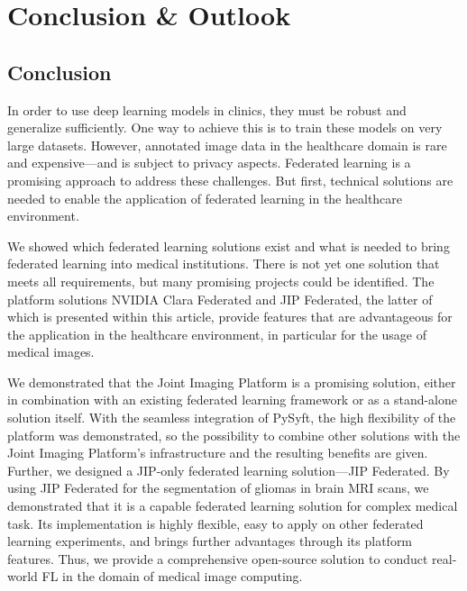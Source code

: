 \section{Conclusion \& Outlook}
\label{sec:ConclusionOutlook}

\subsection{Conclusion}
\label{subsec:Conclusion}
In order to use deep learning models in clinics, they must be robust and generalize sufficiently. One way to achieve this is to train these models on very large datasets. However, annotated image data in the healthcare domain is rare and expensive---and is subject to privacy aspects.
Federated learning is a promising approach to address these challenges. But first, technical solutions are needed to enable the application of federated learning in the healthcare environment.


We showed which federated learning solutions exist and what is needed to bring federated learning into medical institutions. There is not yet one solution that meets all requirements, but many promising projects could be identified.
The platform solutions NVIDIA Clara Federated and JIP Federated, the latter of which is presented within this article, provide features that are advantageous for the application in the healthcare environment, in particular for the usage of medical images.

We demonstrated that the Joint Imaging Platform is a promising solution, either in combination with an existing federated learning framework or as a stand-alone solution itself.
With the seamless integration of PySyft, the high flexibility of the platform was demonstrated, so the possibility to combine other solutions with the Joint Imaging Platform's infrastructure and the resulting benefits are given.
Further, we designed a JIP-only federated learning solution---JIP Federated.
By using JIP Federated for the segmentation of gliomas in brain MRI scans, we demonstrated that it is a capable federated learning solution for complex medical task. Its implementation is highly flexible, easy to apply on other federated learning experiments, and brings further advantages through its platform features.
Thus, we provide a comprehensive open-source solution to conduct real-world FL in the domain of medical image computing.

